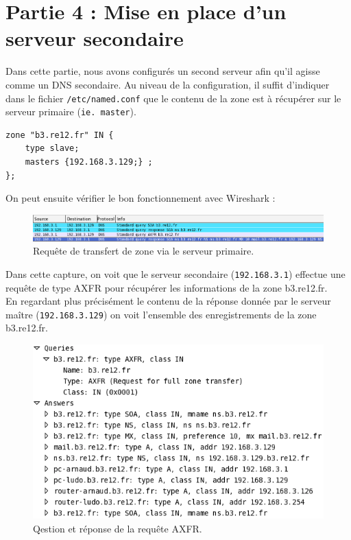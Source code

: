 \documentclass[12pt,a4paper,notitlepage]{article}
\begin{document}
\section{Partie 4 : Mise en place d'un serveur secondaire}

Dans cette partie, nous avons configurés un second serveur afin qu'il agisse comme un DNS secondaire. Au niveau de la configuration, il suffit d'indiquer dans le fichier \texttt{/etc/named.conf} que le contenu de la zone est à récupérer sur le serveur primaire (\texttt{ie. master}).\\


\begin{lstlisting}[title=Configuration du serveur secondaire]
zone "b3.re12.fr" IN {
	type slave;
	masters {192.168.3.129;} ;
};
\end{lstlisting}\bigskip
\clearpage
On peut ensuite vérifier le bon fonctionnement avec Wireshark :

\begin{figure}[!h]
\begin{center}
\includegraphics[scale=0.41]{dns-secondaire}
\caption{Requête de transfert de zone via le serveur primaire.}
\label{fig:da}
\end{center}
\end{figure}

Dans cette capture, on voit que le serveur secondaire (\texttt{192.168.3.1}) effectue une requête de type AXFR pour récupérer les informations de la  zone b3.re12.fr.\\

En regardant plus précisément le contenu de la réponse donnée par le serveur maître (\texttt{192.168.3.129}) on voit l'ensemble des enregistrements de la zone b3.re12.fr.
\begin{figure}[!h]
\begin{center}
\includegraphics[scale=0.7]{axfr}
\caption{Qestion et réponse de la requête AXFR.}
\label{fig:da}
\end{center}
\end{figure}
\end{document}
